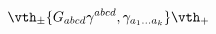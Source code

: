 \begin{equation}
  \label{eq:dilatino}
\vth_\pm \{G_{abcd}\gamma^{abcd}, \gamma_{a_1\ldots a_k}\}\vth_+  
\end{equation}

